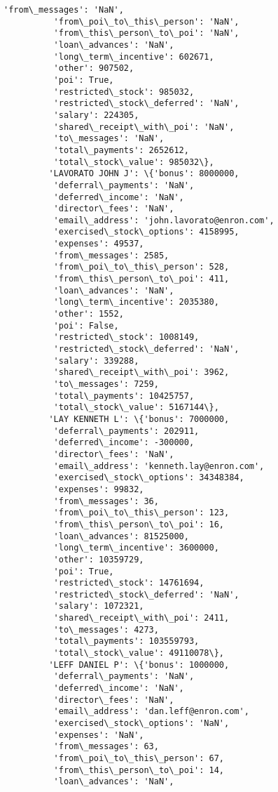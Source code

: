 \documentclass[11pt]{article}
\begin{document}
\begin{Verbatim}[commandchars=\\\{\}]
          'from\_messages': 'NaN',
          'from\_poi\_to\_this\_person': 'NaN',
          'from\_this\_person\_to\_poi': 'NaN',
          'loan\_advances': 'NaN',
          'long\_term\_incentive': 602671,
          'other': 907502,
          'poi': True,
          'restricted\_stock': 985032,
          'restricted\_stock\_deferred': 'NaN',
          'salary': 224305,
          'shared\_receipt\_with\_poi': 'NaN',
          'to\_messages': 'NaN',
          'total\_payments': 2652612,
          'total\_stock\_value': 985032\},
         'LAVORATO JOHN J': \{'bonus': 8000000,
          'deferral\_payments': 'NaN',
          'deferred\_income': 'NaN',
          'director\_fees': 'NaN',
          'email\_address': 'john.lavorato@enron.com',
          'exercised\_stock\_options': 4158995,
          'expenses': 49537,
          'from\_messages': 2585,
          'from\_poi\_to\_this\_person': 528,
          'from\_this\_person\_to\_poi': 411,
          'loan\_advances': 'NaN',
          'long\_term\_incentive': 2035380,
          'other': 1552,
          'poi': False,
          'restricted\_stock': 1008149,
          'restricted\_stock\_deferred': 'NaN',
          'salary': 339288,
          'shared\_receipt\_with\_poi': 3962,
          'to\_messages': 7259,
          'total\_payments': 10425757,
          'total\_stock\_value': 5167144\},
         'LAY KENNETH L': \{'bonus': 7000000,
          'deferral\_payments': 202911,
          'deferred\_income': -300000,
          'director\_fees': 'NaN',
          'email\_address': 'kenneth.lay@enron.com',
          'exercised\_stock\_options': 34348384,
          'expenses': 99832,
          'from\_messages': 36,
          'from\_poi\_to\_this\_person': 123,
          'from\_this\_person\_to\_poi': 16,
          'loan\_advances': 81525000,
          'long\_term\_incentive': 3600000,
          'other': 10359729,
          'poi': True,
          'restricted\_stock': 14761694,
          'restricted\_stock\_deferred': 'NaN',
          'salary': 1072321,
          'shared\_receipt\_with\_poi': 2411,
          'to\_messages': 4273,
          'total\_payments': 103559793,
          'total\_stock\_value': 49110078\},
         'LEFF DANIEL P': \{'bonus': 1000000,
          'deferral\_payments': 'NaN',
          'deferred\_income': 'NaN',
          'director\_fees': 'NaN',
          'email\_address': 'dan.leff@enron.com',
          'exercised\_stock\_options': 'NaN',
          'expenses': 'NaN',
          'from\_messages': 63,
          'from\_poi\_to\_this\_person': 67,
          'from\_this\_person\_to\_poi': 14,
          'loan\_advances': 'NaN',

\end{Verbatim}
\end{document}
